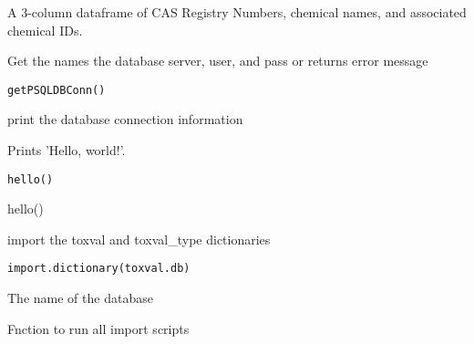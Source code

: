 \documentclass[letterpaper]{book}
\begin{document}
%
\begin{Value}
A 3-column dataframe of CAS Registry Numbers, chemical names, and associated chemical IDs.
\end{Value}
%
\begin{Description}\relax
Get the names the database server, user, and pass or returns error message
\end{Description}
%
\begin{Usage}
\begin{verbatim}
getPSQLDBConn()
\end{verbatim}
\end{Usage}
%
\begin{Value}
print the database connection information
\end{Value}
%
\begin{Description}\relax
Prints 'Hello, world!'.
\end{Description}
%
\begin{Usage}
\begin{verbatim}
hello()
\end{verbatim}
\end{Usage}
%
\begin{Examples}
\begin{ExampleCode}
hello()
\end{ExampleCode}
\end{Examples}
%
\begin{Description}\relax
import the toxval and toxval\_type dictionaries
\end{Description}
%
\begin{Usage}
\begin{verbatim}
import.dictionary(toxval.db)
\end{verbatim}
\end{Usage}
%
\begin{Arguments}
\begin{ldescription}
\item[\code{toxval.db}] The name of the database
\end{ldescription}
\end{Arguments}
%
\begin{Description}\relax
Fnction to run all import scripts
\end{Description}
\end{document}
